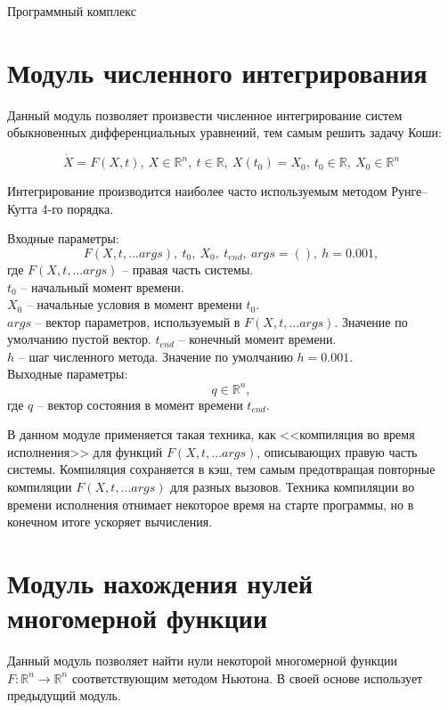 \begin{chapter}{Программный комплекс}
\section{Модуль численного интегрирования}
Данный модуль позволяет произвести численное интегрирование систем обыкновенных
дифференциальных уравнений, тем самым решить задачу Коши:

$$
\dot{X} = F(X, t), \ X \in \mathbb{R}^n, \ t \in \mathbb{R}, \ X(t_0) = X_0, \ t_0 \in \mathbb{R}, \ X_0 \in \mathbb{R}^n
$$

Интегрирование производится наиболее часто используемым методом Рунге--Кутта 4-го порядка.

Входные параметры: $$F(X, t, ...args), \ t_0, \ X_0,  \ t_{end}, \ args = (), \ h=0.001,$$
где $F(X, t, ...args)$ -- правая часть системы. \\
$t_0$ -- начальный момент времени. \\
$X_0$ -- начальные условия в момент времени $t_0$. \\
$args$ -- вектор параметров, используемый в $F(X, t, ...args)$. Значение по умолчанию пустой вектор.
$t_{end}$ -- конечный момент времени. \\
$h$ -- шаг численного метода. Значение по умолчанию $h = 0.001$. \\
Выходные параметры: $$ q \in \mathbb{R}^n,$$
где $q$ -- вектор состояния в момент времени $t_{end}$.

В данном модуле применяется такая техника, как <<компиляция во время исполнения>>
для функций $F(X, t, ...args)$, описывающих правую часть системы. Компиляция сохраняется в кэш, тем
самым предотвращая повторные компиляции $F(X, t, ...args)$ для разных вызовов.
Техника компиляции во времени исполнения отнимает некоторое время на старте программы, но в конечном итоге ускоряет вычисления.

\section{Модуль нахождения нулей многомерной функции}
Данный модуль позволяет найти нули некоторой многомерной функции $F: \mathbb{R}^n \rightarrow \mathbb{R}^n$ соответствующим методом Ньютона.
В своей основе использует предыдущий модуль.


\end{chapter}
